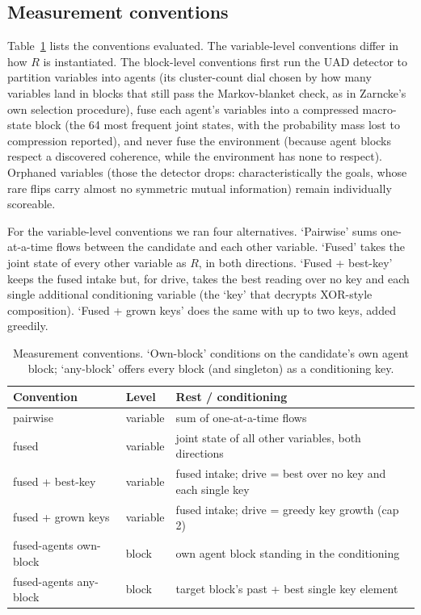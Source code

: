 \documentclass[11pt]{article}
\begin{document}
\subsection{Measurement conventions}\label{sec:conventions}
Table~\ref{tab:conventions} lists the conventions evaluated. The variable-level
conventions differ in how $R$ is instantiated. The block-level conventions first run
the UAD detector to partition variables into agents (its cluster-count dial chosen by
how many variables land in blocks that still pass the Markov-blanket check, as in
Zarncke's own selection procedure), fuse each agent's variables into a compressed
macro-state block (the 64 most frequent joint states, with the probability mass lost
to compression reported), and never fuse the environment (because agent blocks respect
a discovered coherence, while the environment has none to respect). Orphaned variables
(those the detector drops: characteristically the goals, whose rare flips carry almost
no symmetric mutual information) remain individually scoreable.

For the variable-level conventions we ran four alternatives. `Pairwise' sums
one-at-a-time flows between the candidate and each other variable. `Fused' takes the
joint state of every other variable as $R$, in both directions. `Fused + best-key'
keeps the fused intake but, for drive, takes the best reading over no key and each
single additional conditioning variable (the `key' that decrypts XOR-style
composition). `Fused + grown keys' does the same with up to two keys, added greedily.

\begin{table}[t]
\centering\small
\caption{Measurement conventions. `Own-block' conditions on the candidate's own agent
block; `any-block' offers every block (and singleton) as a conditioning key.}
\label{tab:conventions}
\begin{tabular}{@{}llp{7.6cm}@{}}
\toprule
Convention & Level & Rest / conditioning \\
\midrule
pairwise & variable & sum of one-at-a-time flows \\
fused & variable & joint state of all other variables, both directions \\
fused + best-key & variable & fused intake; drive = best over no key and each single key \\
fused + grown keys & variable & fused intake; drive = greedy key growth (cap 2) \\
fused-agents own-block & block & own agent block standing in the conditioning \\
fused-agents any-block & block & target block's past + best single key element \\
\bottomrule
\end{tabular}
\end{table}
\end{document}
